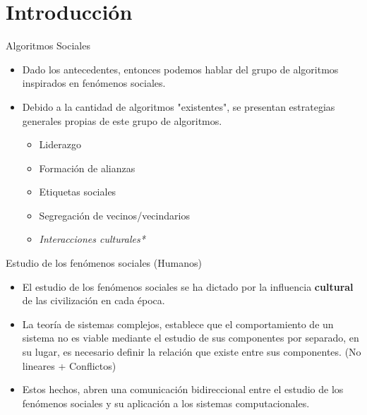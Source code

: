\documentclass{beamer}
\begin{document}
\section{Introducción}


\begin{frame}{Algoritmos Sociales}
    \begin{itemize}
        \item Dado los antecedentes, entonces podemos hablar del grupo de algoritmos inspirados en fenómenos sociales. 
        \item Debido a la cantidad de algoritmos "existentes", se presentan estrategias generales propias de este grupo de algoritmos.
        \vspace{1cm}
        \begin{itemize}
            \item Liderazgo
            \item Formación de alianzas
            \item Etiquetas sociales
            \item Segregación de vecinos/vecindarios
            \item \textit{Interacciones culturales*} 
        \end{itemize}
    \end{itemize}
\end{frame}

\begin{frame}{Estudio de los fenómenos sociales (Humanos)}
\begin{itemize}
    \item El estudio de los fenómenos sociales se ha dictado por la influencia \textbf{cultural} de las civilización en cada época.
    \item La teoría de sistemas complejos, establece que el comportamiento de un sistema no es viable mediante el estudio de sus componentes por separado, en su lugar, es necesario definir la relación que existe entre sus componentes. (No lineares + Conflictos)

    \item Estos hechos, abren una comunicación bidireccional entre el estudio de los fenómenos sociales y su aplicación a los sistemas computacionales.
\end{itemize}
\end{frame}
\end{document}
